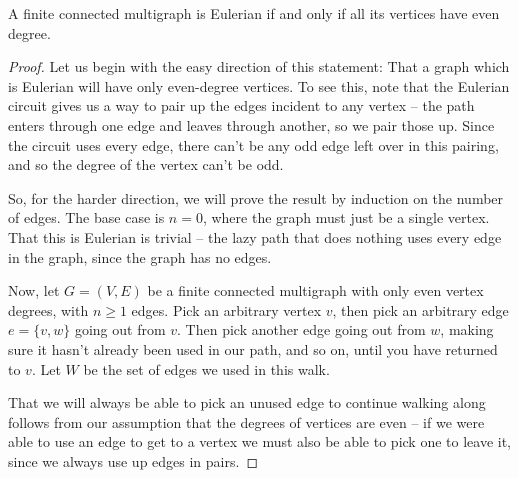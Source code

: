 \documentclass[nobib]{tufte-handout}
\begin{document}
\begin{theorem}[Euler (1736)]
  A finite connected multigraph is Eulerian if and only if all its vertices have even degree.

  \begin{proof}
    Let us begin with the easy direction of this statement: That a graph which is Eulerian will have only even-degree vertices. To see this, note that the Eulerian circuit gives us a way to pair up the edges incident to any vertex -- the path enters through one edge and leaves through another, so we pair those up. Since the circuit uses every edge, there can't be any odd edge left over in this pairing, and so the degree of the vertex can't be odd.

    So, for the harder direction, we will prove the result by induction on the number of edges. The base case is $n=0$, where the graph must just be a single vertex. That this is Eulerian is trivial -- the lazy path that does nothing uses every edge in the graph, since the graph has no edges.

    Now, let $G = (V,E)$ be a finite connected multigraph with only even vertex degrees, with $n \geq 1$ edges. Pick an arbitrary vertex $v$, then pick an arbitrary edge $e = \{v, w\}$ going out from $v$. Then pick another edge going out from $w$, making sure it hasn't already been used in our path, and so on, until you have returned to $v$. Let $W$ be the set of edges we used in this walk.

    That we will always be able to pick an unused edge to continue walking along follows from our assumption that the degrees of vertices are even -- if we were able to use an edge to get to a vertex we must also be able to pick one to leave it, since we always use up edges in pairs.
    

\end{proof}
\end{theorem}
\end{document}

